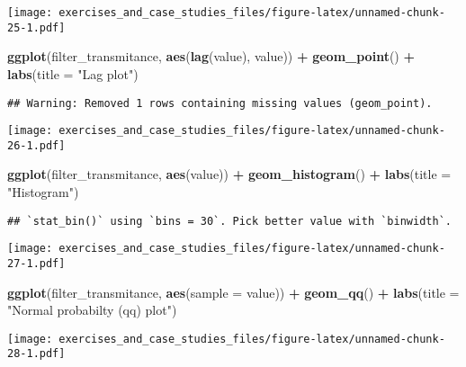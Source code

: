 \documentclass[]{book}
\newenvironment{Shaded}{\begin{snugshade}}{\end{snugshade}}
\newcommand{\DataTypeTok}[1]{\textcolor[rgb]{0.13,0.29,0.53}{#1}}
\newcommand{\KeywordTok}[1]{\textcolor[rgb]{0.13,0.29,0.53}{\textbf{#1}}}
\newcommand{\NormalTok}[1]{#1}
\newcommand{\OperatorTok}[1]{\textcolor[rgb]{0.81,0.36,0.00}{\textbf{#1}}}
\newcommand{\StringTok}[1]{\textcolor[rgb]{0.31,0.60,0.02}{#1}}
\theoremstyle{definition}
\theoremstyle{definition}
\theoremstyle{definition}
\theoremstyle{remark}
\begin{document}
\texttt{[image: exercises\_and\_case\_studies\_files/figure-latex/unnamed-chunk-25-1.pdf]}

\begin{Shaded}
\begin{Highlighting}[]
\KeywordTok{ggplot}\NormalTok{(filter_transmitance, }\KeywordTok{aes}\NormalTok{(}\KeywordTok{lag}\NormalTok{(value), value)) }\OperatorTok{+}
\StringTok{  }\KeywordTok{geom_point}\NormalTok{() }\OperatorTok{+}
\StringTok{  }\KeywordTok{labs}\NormalTok{(}\DataTypeTok{title =} \StringTok{"Lag plot"}\NormalTok{)}
\end{Highlighting}
\end{Shaded}

\begin{verbatim}
## Warning: Removed 1 rows containing missing values (geom_point).
\end{verbatim}

\texttt{[image: exercises\_and\_case\_studies\_files/figure-latex/unnamed-chunk-26-1.pdf]}

\begin{Shaded}
\begin{Highlighting}[]
\KeywordTok{ggplot}\NormalTok{(filter_transmitance, }\KeywordTok{aes}\NormalTok{(value)) }\OperatorTok{+}
\StringTok{  }\KeywordTok{geom_histogram}\NormalTok{() }\OperatorTok{+}
\StringTok{  }\KeywordTok{labs}\NormalTok{(}\DataTypeTok{title =} \StringTok{"Histogram"}\NormalTok{)}
\end{Highlighting}
\end{Shaded}

\begin{verbatim}
## `stat_bin()` using `bins = 30`. Pick better value with `binwidth`.
\end{verbatim}

\texttt{[image: exercises\_and\_case\_studies\_files/figure-latex/unnamed-chunk-27-1.pdf]}

\begin{Shaded}
\begin{Highlighting}[]
\KeywordTok{ggplot}\NormalTok{(filter_transmitance, }\KeywordTok{aes}\NormalTok{(}\DataTypeTok{sample =}\NormalTok{ value)) }\OperatorTok{+}
\StringTok{  }\KeywordTok{geom_qq}\NormalTok{() }\OperatorTok{+}
\StringTok{  }\KeywordTok{labs}\NormalTok{(}\DataTypeTok{title =} \StringTok{"Normal probabilty (qq) plot"}\NormalTok{)}
\end{Highlighting}
\end{Shaded}

\texttt{[image: exercises\_and\_case\_studies\_files/figure-latex/unnamed-chunk-28-1.pdf]}
\end{document}
